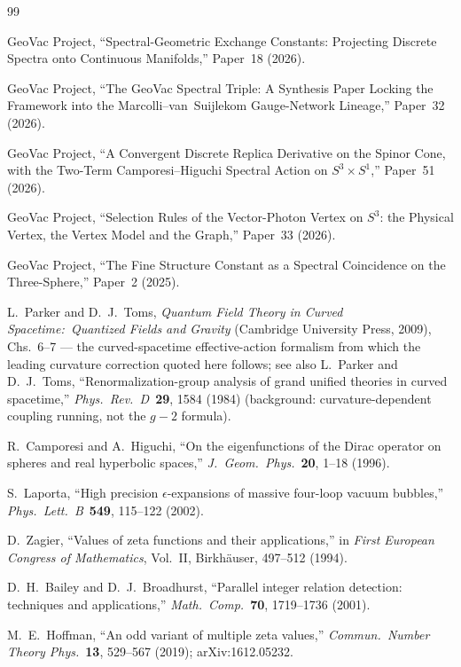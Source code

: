 \documentclass[11pt]{article}
\begin{document}
\begin{thebibliography}{99}

GeoVac Project, ``Spectral-Geometric Exchange Constants: Projecting
Discrete Spectra onto Continuous Manifolds,'' Paper~18 (2026).

GeoVac Project, ``The GeoVac Spectral Triple: A Synthesis Paper Locking
the Framework into the Marcolli--van~Suijlekom Gauge-Network Lineage,''
Paper~32 (2026).

GeoVac Project, ``A Convergent Discrete Replica Derivative on the
Spinor Cone, with the Two-Term Camporesi--Higuchi Spectral Action on
$S^3\times S^1$,'' Paper~51 (2026).

GeoVac Project, ``Selection Rules of the Vector-Photon Vertex on $S^3$:
the Physical Vertex, the Vertex Model and the Graph,'' Paper~33 (2026).

GeoVac Project, ``The Fine Structure Constant as a Spectral Coincidence
on the Three-Sphere,'' Paper~2 (2025).

L.~Parker and D.~J.~Toms,
\textit{Quantum Field Theory in Curved Spacetime:\ Quantized Fields
and Gravity} (Cambridge University Press, 2009), Chs.~6--7 --- the
curved-spacetime effective-action formalism from which the leading
curvature correction quoted here follows; see also L.~Parker and
D.~J.~Toms, ``Renormalization-group analysis of grand unified
theories in curved spacetime,''
\textit{Phys.~Rev.~D}\ \textbf{29}, 1584 (1984) (background:
curvature-dependent coupling running, not the $g{-}2$ formula).

R.~Camporesi and A.~Higuchi, ``On the eigenfunctions of the Dirac
operator on spheres and real hyperbolic spaces,''
\textit{J.~Geom.~Phys.}\ \textbf{20}, 1--18 (1996).

S.~Laporta, ``High precision $\epsilon$-expansions of massive four-loop
vacuum bubbles,''
\textit{Phys.~Lett.~B}\ \textbf{549}, 115--122 (2002).

D.~Zagier, ``Values of zeta functions and their applications,''
in \textit{First European Congress of Mathematics}, Vol.~II,
Birkh\"auser, 497--512 (1994).

D.~H.~Bailey and D.~J.~Broadhurst, ``Parallel integer relation
detection: techniques and applications,''
\textit{Math.~Comp.}\ \textbf{70}, 1719--1736 (2001).

M.~E.~Hoffman, ``An odd variant of multiple zeta values,''
\textit{Commun.~Number Theory Phys.}\ \textbf{13}, 529--567 (2019);
arXiv:1612.05232.


\end{thebibliography}
\end{document}

